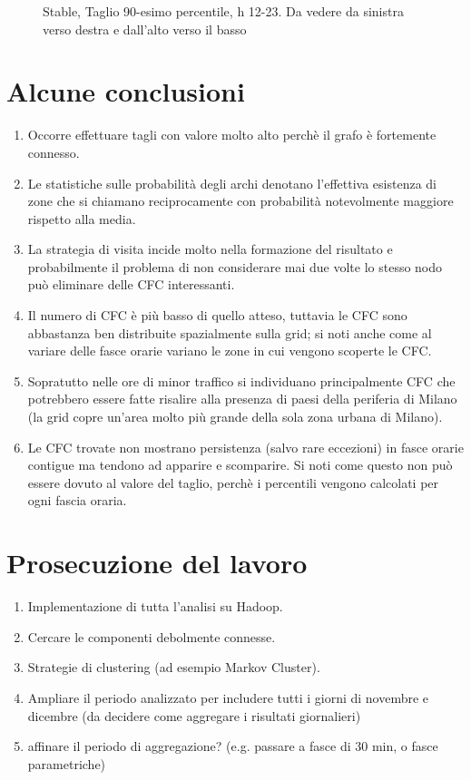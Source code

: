 \documentclass[10pt,a4paper]{article}
\begin{document}
\begin{figure}
\begin{subfigure}[b]{1\textwidth}
\end{subfigure}
\caption{Stable, Taglio 90-esimo percentile, h 12-23. Da vedere da sinistra verso destra e dall'alto verso il basso}
\label{cut901}
\end{figure}

\section{Alcune conclusioni}

\begin{enumerate}
\item Occorre effettuare tagli con valore molto alto perchè il grafo è fortemente connesso.
\item Le statistiche sulle probabilità degli archi denotano l'effettiva esistenza di zone che si chiamano reciprocamente con probabilità notevolmente maggiore rispetto alla media.
\item La strategia di visita incide molto nella formazione del risultato e probabilmente il problema di
non considerare mai due volte lo stesso nodo può eliminare delle CFC interessanti.
\item Il numero di CFC è più basso di quello atteso, tuttavia le CFC sono abbastanza ben distribuite spazialmente 
sulla grid; si noti anche come al variare delle fasce orarie variano le zone in cui vengono scoperte
le CFC.
\item Sopratutto nelle ore di minor traffico si individuano principalmente CFC che potrebbero essere
fatte risalire alla presenza di paesi della periferia di Milano (la grid copre un'area molto più grande
della sola zona urbana di Milano).
\item Le CFC trovate non mostrano persistenza (salvo rare eccezioni) in fasce orarie contigue ma tendono
ad apparire e scomparire. Si noti come questo non può essere dovuto al valore del taglio, perchè
i percentili vengono calcolati per ogni fascia oraria.
\end{enumerate}

\section{Prosecuzione del lavoro}

\begin{enumerate}
\item Implementazione di tutta l'analisi su Hadoop.
\item Cercare le  componenti debolmente connesse.
\item Strategie di clustering (ad esempio Markov Cluster).
\item Ampliare il periodo analizzato per includere tutti i giorni di novembre e dicembre (da decidere
come aggregare i risultati giornalieri)
\item affinare il periodo di aggregazione? (e.g. passare a fasce di 30 min, o fasce parametriche)
\end{enumerate}
\end{document}
